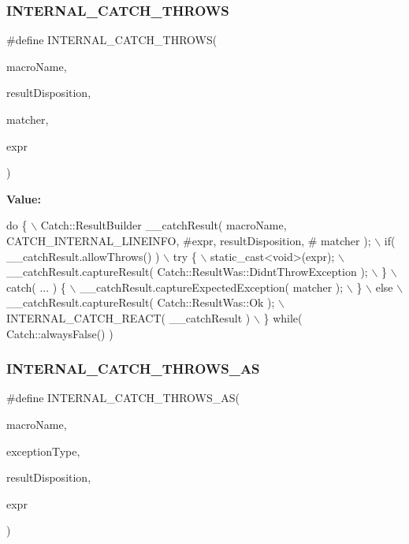 \subsubsection{I\+N\+T\+E\+R\+N\+A\+L\+\_\+\+C\+A\+T\+C\+H\+\_\+\+T\+H\+R\+O\+WS}
{\footnotesize\ttfamily \#define I\+N\+T\+E\+R\+N\+A\+L\+\_\+\+C\+A\+T\+C\+H\+\_\+\+T\+H\+R\+O\+WS(\begin{DoxyParamCaption}\item[{}]{macro\+Name,  }\item[{}]{result\+Disposition,  }\item[{}]{matcher,  }\item[{}]{expr }\end{DoxyParamCaption})}

{\bfseries Value\+:}
\begin{DoxyCode}
\textcolor{keywordflow}{do} \{ \(\backslash\)
        Catch::ResultBuilder \_\_catchResult( macroName, CATCH_INTERNAL_LINEINFO, #expr, resultDisposition, #
      matcher ); \(\backslash\)
        if( \_\_catchResult.allowThrows() ) \(\backslash\)
            \textcolor{keywordflow}{try} \{ \(\backslash\)
                static\_cast<\textcolor{keywordtype}{void}>(expr); \(\backslash\)
                \_\_catchResult.captureResult( 
      Catch::ResultWas::DidntThrowException ); \(\backslash\)
            \} \(\backslash\)
            catch( ... ) \{ \(\backslash\)
                \_\_catchResult.captureExpectedException( matcher ); \(\backslash\)
            \} \(\backslash\)
        else \(\backslash\)
            \_\_catchResult.captureResult( Catch::ResultWas::Ok ); \(\backslash\)
        INTERNAL\_CATCH\_REACT( \_\_catchResult ) \(\backslash\)
    \} \textcolor{keywordflow}{while}( Catch::alwaysFalse() )
\end{DoxyCode}
\mbox{\label{catch_8hpp_a5e87b48ab40b7b128ae8428c14c25a91}} 
\subsubsection{I\+N\+T\+E\+R\+N\+A\+L\+\_\+\+C\+A\+T\+C\+H\+\_\+\+T\+H\+R\+O\+W\+S\+\_\+\+AS}
{\footnotesize\ttfamily \#define I\+N\+T\+E\+R\+N\+A\+L\+\_\+\+C\+A\+T\+C\+H\+\_\+\+T\+H\+R\+O\+W\+S\+\_\+\+AS(\begin{DoxyParamCaption}\item[{}]{macro\+Name,  }\item[{}]{exception\+Type,  }\item[{}]{result\+Disposition,  }\item[{}]{expr }\end{DoxyParamCaption})}

